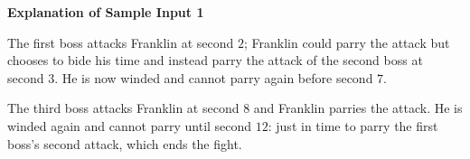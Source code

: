 \textbf{Explanation of Sample Input 1}

The first boss attacks Franklin at second $2$; Franklin could parry the attack but chooses to bide his time and instead parry the attack of the second boss at second $3$. He is now winded and cannot parry again before second $7$.

The third boss attacks Franklin at second $8$ and Franklin parries the attack. He is winded again and cannot parry until second $12$: just in time to parry the first boss's second attack, which ends the fight.